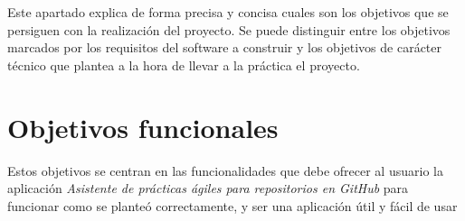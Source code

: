  \label{sec:objetivos}

Este apartado explica de forma precisa y concisa cuales son los objetivos que se persiguen con la realización del proyecto. Se puede distinguir entre los objetivos marcados por los requisitos del software a construir y los objetivos de carácter técnico que plantea a la hora de llevar a la práctica el proyecto.

\section{Objetivos funcionales}

Estos objetivos se centran en las funcionalidades que debe ofrecer al usuario la aplicación \textit{Asistente de prácticas ágiles para repositorios en GitHub} para funcionar como se planteó correctamente, y ser una aplicación útil y fácil de usar

